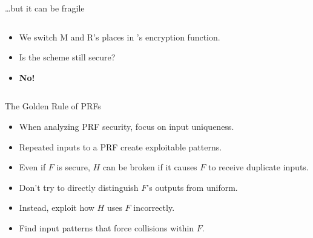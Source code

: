 \documentclass[aspectratio=169, lualatex, handout]{beamer}
\begin{document}
\begin{frame}{\ldots but it can be fragile}
	\begin{columns}[c]
		\begin{column}{0.5\textwidth}
			\begin{itemize}[<+->]
				\item We switch M and R's places in 's encryption function.
				\item Is the scheme still secure?
				\item \textbf{No!}
			\end{itemize}
		\end{column}
		\begin{column}{0.5\textwidth}
		\end{column}
	\end{columns}
\end{frame}

\begin{frame}{The Golden Rule of PRFs}
	\begin{itemize}[<+->]
		\item When analyzing PRF security, focus on input uniqueness.
		\item Repeated inputs to a PRF create exploitable patterns.
		\item Even if $F$ is secure, $H$ can be broken if it causes $F$ to receive duplicate inputs.
		\item Don't try to directly distinguish $F$'s outputs from uniform.
		\item Instead, exploit how $H$ uses $F$ incorrectly.
		\item Find input patterns that force collisions within $F$.
	\end{itemize}
\end{frame}
\end{document}
